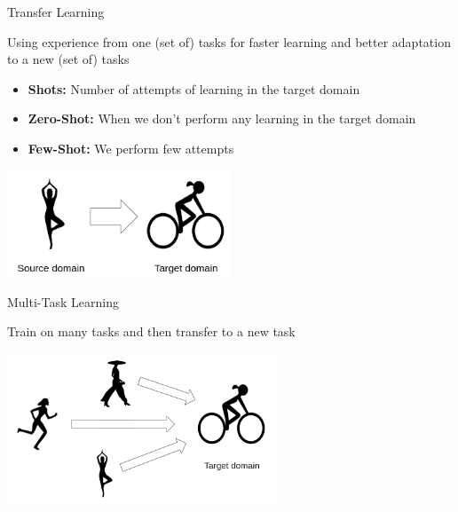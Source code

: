 \documentclass[aspectratio=169]{../latex_main/tntbeamer}  %
\begin{document}
\begin{frame}{Transfer Learning}

Using experience from one (set of) tasks for faster learning and better adaptation to a new (set of) tasks

\begin{itemize}
    \item \textbf{Shots:} Number of attempts of learning in the target domain
    \item \textbf{Zero-Shot:} When we don't perform any learning in the target domain
    \item \textbf{Few-Shot:} We perform few attempts
\end{itemize}

\begin{center}
    \includegraphics[width=0.5\textwidth]{images/t01/transfer-learning.png}
\end{center}


\end{frame}

\begin{frame}{Multi-Task Learning}

Train on many tasks and then transfer to a new task



\begin{center}
    \includegraphics[width=0.6\textwidth]{images/t01/multi-task-learning.png}
\end{center}


\end{frame}
\end{document}
